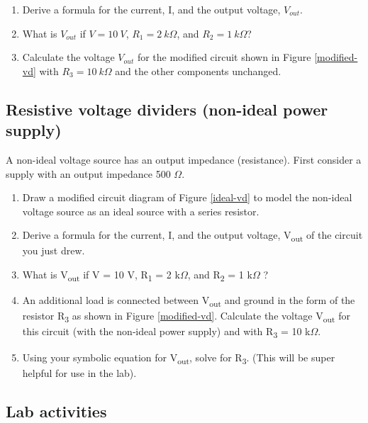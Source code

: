 \documentclass[10pt]{PhysLab1C} %
\begin{document}
\begin{enumerate}
 \item
  Derive a formula for the current, I, and the output voltage, $V_{out}$.
 \item
  What is $V_{out}$ if $V = 10~V$, $R_{1} = 2~k\Omega$, and $R_{2} = 1~k\Omega$?
 \item
  Calculate the voltage $V_{out}$ for the modified circuit
  shown in Figure \ref{modified-vd} with $R_{3} = 10~k\Omega$ and the other
  components unchanged.
\end{enumerate}

\subsection{Resistive voltage dividers (non-ideal power supply)}

A non-ideal voltage source has an output impedance (resistance). First
consider a supply with an output impedance 500 $\Omega$.

\begin{enumerate}
\def\labelenumi{\arabic{enumi}.}
\item
  Draw a modified circuit diagram of Figure \ref{ideal-vd} to model the non-ideal
  voltage source as an ideal source with a series resistor.
\item
  Derive a formula for the current, I, and the output voltage,
  V\textsubscript{out} of the circuit you just drew.
\item
  What is V\textsubscript{out} if V = 10 V, R\textsubscript{1} = 2 k$\Omega$,
  and R\textsubscript{2} = 1 k$\Omega$ ?
\item
  An additional load is connected between V\textsubscript{out} and
  ground in the form of the resistor R\textsubscript{3} as shown in
  Figure \ref{modified-vd}. Calculate the voltage V\textsubscript{out} for this
  circuit (with the non­‐ideal power supply) and with R\textsubscript{3}
  = 10 k$\Omega$.
\item
  Using your symbolic equation for V\textsubscript{out}, solve for
  R\textsubscript{3}. (This will be super helpful for use in the lab).
\end{enumerate}

\subsection{Lab activities}

\end{document}
